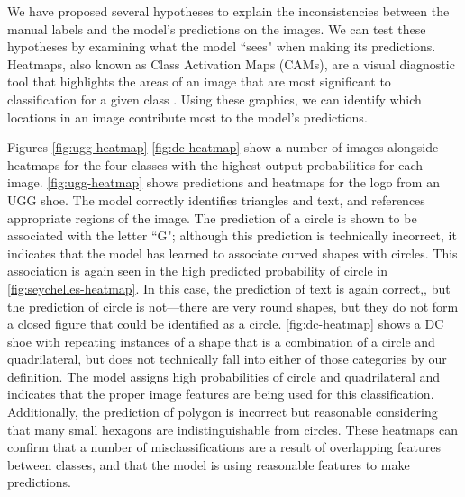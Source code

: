\documentclass{article}\usepackage[]{graphicx}\usepackage[table]{xcolor}
\begin{document}
We have proposed several hypotheses to explain the inconsistencies between the manual labels and the model's predictions on the images. We can test these hypotheses by examining what the model ``sees" when making its predictions. Heatmaps, also known as Class Activation Maps (CAMs), are a visual diagnostic tool that highlights the areas of an image that are most significant to classification for a given class \citep{chollet_allaire_2018}. Using these graphics, we can identify which locations in an image contribute most to the model's predictions.

Figures \ref{fig:ugg-heatmap}-\ref{fig:dc-heatmap} show a number of images alongside heatmaps for the four classes with the highest output probabilities for each image. \autoref{fig:ugg-heatmap} shows predictions and heatmaps for the logo from an UGG shoe. The model correctly identifies triangles and text, and references appropriate regions of the image. The prediction of a circle is shown to be associated with the letter ``G"; although this prediction is technically incorrect, it indicates that the model has learned to associate curved shapes with circles. This association is again seen in the high predicted probability of circle in \autoref{fig:seychelles-heatmap}. In this case, the prediction of text is again correct,, but the prediction of circle is not---there are very round shapes, but they do not form a closed figure that could be identified as a circle. \autoref{fig:dc-heatmap} shows a DC shoe with repeating instances of a shape that is a combination of a circle and quadrilateral, but does not technically fall into either of those categories by our definition. The model assigns high probabilities of circle and quadrilateral and indicates that the proper image features are being used for this classification. Additionally, the prediction of polygon is incorrect but reasonable considering that many small hexagons are indistinguishable from circles. These heatmaps can confirm that a number of misclassifications are a result of overlapping features between classes, and that the model is using reasonable features to make predictions.
\end{document}

